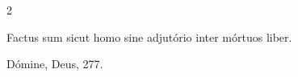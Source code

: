 \documentclass[9pt,twoside]{extarticle}
\begin{document}
\begin{multicols}{2}
%
%
%
%
%
%
%
%
%
%
%
%

\begin{tightlist}{}
\item {} Factus sum sicut homo sine adjutório inter mórtuos liber.
\item {} Dómine, Deus, 277.
\end{tightlist}{}


\end{multicols}
\end{document}
